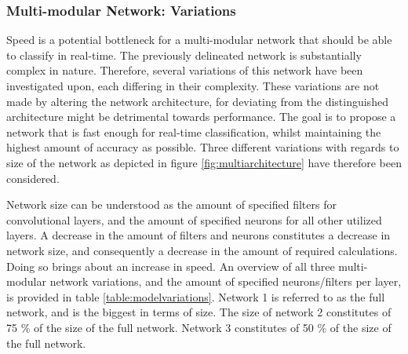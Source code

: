 \documentclass[12pt]{article}
\begin{document}
\subsubsection{Multi-modular Network: Variations}
Speed is a potential bottleneck for a multi-modular network that should be able to classify in real-time. The previously delineated network is substantially complex in nature. Therefore, several variations of this network have been investigated upon, each differing in their complexity. These variations are not made by altering the network architecture, for deviating from the distinguished architecture might be detrimental towards performance. The goal is to propose a network that is fast enough for real-time classification, whilst maintaining the highest amount of accuracy as possible. Three different variations with regards to size of the network as depicted in figure \ref{fig:multiarchitecture} have therefore been considered.

Network size can be understood as the amount of specified filters for convolutional layers, and the amount of specified neurons for all other utilized layers. A decrease in the amount of filters and neurons constitutes a decrease in network size, and consequently a decrease in the amount of required calculations. Doing so brings about an increase in speed. An overview of all three multi-modular network variations, and the amount of specified neurons/filters per layer, is provided in table \ref{table:modelvariations}. Network 1 is referred to as the full network, and is the biggest in terms of size. The size of network 2 constitutes of 75 \% of the size of the full network. Network 3 constitutes of 50 \% of the size of the full network.
\end{document}

